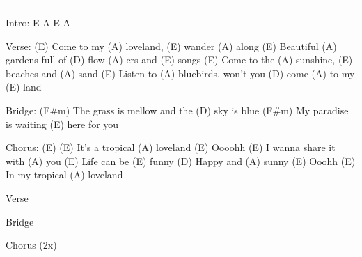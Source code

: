 \noindent\rule{\columnwidth}{1pt}

\begin{lstsong}
Intro:  E  A  E  A

Verse:
(E) Come to my (A) loveland, (E) wander (A) along
(E) Beautiful (A) gardens full of (D) flow (A) ers and (E) songs
(E) Come to the (A) sunshine, (E) beaches and (A) sand
(E) Listen to (A) bluebirds, won't you (D) come (A) to my (E) land

Bridge:
(F#m) The grass is mellow and the (D) sky is blue
(F#m) My paradise is waiting (E) here for you

Chorus:
(E) (E) It's a tropical (A) loveland
(E) Oooohh (E) I wanna share it with (A) you
(E) Life can be (E) funny
(D) Happy and (A) sunny
(E) Ooohh (E) In my tropical (A) loveland

Verse

Bridge

Chorus (2x)
\end{lstsong}
\newpage

